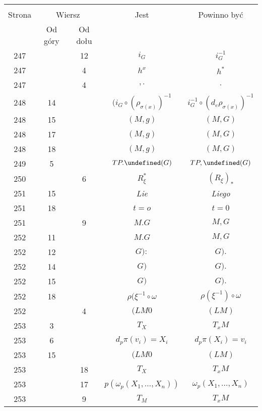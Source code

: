 \documentclass[a4paper,11pt]{article}
\newcommand{\mc}{\mathcal}
\newcommand{\ld}{\ldots}
\newcommand{\om}{\omega}
\newcommand{\s}{\sigma}
\let\L\undefined
\newcommand{\L}{\mc{L}}
\begin{document}
\begin{center}
  \begin{tabular}{|c|c|c|c|c|}
    \hline
    & \multicolumn{2}{c|}{} & & \\
    Strona & \multicolumn{2}{c|}{Wiersz} & Jest
                              & Powinno być \\ \cline{2-3}
    & Od góry & Od dołu &  &  \\
    \hline
    247 & & 12 & $i_{ G }$ & $i_{ G }^{ -1 }$ \\
    247 & &  4 & $h^{ x }$ & $h^{ * }$ \\
    247 & &  4 & $, .$ & $.$ \\
    248 & 14 & & $( i_{ G } \circ ( \rho_{ \s( x ) } )^{ -1 }$
           & $i_{ G }^{ -1 } \circ ( d_{ e }\rho_{ \s( x ) } )^{ -1 }$ \\
    248 & 15 & & $( M, g )$ & $( M, G )$ \\
    248 & 17 & & $( M, g )$ & $( M, G )$ \\
    248 & 18 & & $( M, g )$ & $( M, G )$ \\
    249 &  5 & & $TP.\L(G)$ & $TP, \L(G)$ \\
    250 & & 6 & $R_{ \xi }^{ * }$ & $( R_{ \xi } )_{ * }$ \\
    251 & 15 & & \emph{Lie} & \emph{Liego} \\
    251 & 18 & & $t = o$ & $t = 0$ \\
    251 & &  9 & $M.G$ & $M, G$ \\
    252 & 11 & & $M.G$ & $M, G$ \\
    252 & 12 & & $G):$ & $G).$ \\
    252 & 14 & & $G)$ & $G).$ \\
    252 & 15 & & $G)$ & $G).$ \\
    252 & 18 & & $\rho( \xi^{ -1 } \circ \om$ & $\rho( \xi^{ -1 } )
                                                \circ \om$ \\
    252 & & 4 & $( LM 0$ & $( LM )$ \\
    253 & 3 & & $T_{ X }$ & $T_{ x }M$ \\
    253 & 6 & & $d_{ p } \pi( v_{ i } ) = X_ { i }$
           & $d_{ p } \pi( X_{ i }) = v_ { i }$ \\
    253 & 15 & & $( LM 0$ & $( LM )$ \\
    253 & & 18 & $T_{ X }$ & $T_{ x }M$ \\
    253 & & 17 & $p( \om_{ p }( X_{ 1 }, \ld, X_{ n } ) )$
           & $\om_{ p }( X_{ 1 }, \ld, X_{ n } )$ \\
    253 & &  9 & $T_{ M }$ & $T_{ x }M$ \\

\end{tabular}
\end{center}
\end{document}
